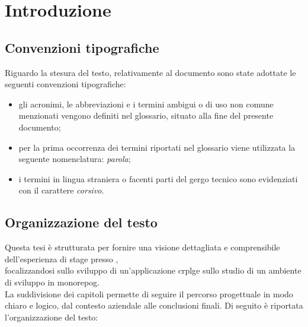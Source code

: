 \chapter{Introduzione}
\label{chap:introduzione}

\section{Convenzioni tipografiche}
Riguardo la stesura del testo, relativamente al documento sono state adottate le seguenti convenzioni tipografiche:
\begin{itemize}
	\item gli acronimi, le abbreviazioni e i termini ambigui o di uso non comune menzionati vengono definiti nel glossario, situato alla fine del presente documento;
	\item per la prima occorrenza dei termini riportati nel glossario viene utilizzata la seguente nomenclatura: \textit{parola}\glox\gloxspacing;
	\item i termini in lingua straniera o facenti parti del gergo tecnico sono evidenziati con il carattere \textit{corsivo}.
\end{itemize}

\section{Organizzazione del testo}
Questa tesi è strutturata per fornire una visione dettagliata e comprensibile dell'esperienza di stage presso \myAzienda,
\\focalizzandosi sullo sviluppo di un'applicazione \gls{crplg}\glox e sullo studio di un ambiente di sviluppo in \gls{monorepog}\glox.
\\La suddivisione dei capitoli permette di seguire il percorso progettuale in modo chiaro e logico, dal contesto aziendale alle conclusioni finali. 
Di seguito è riportata l'organizzazione del testo:


